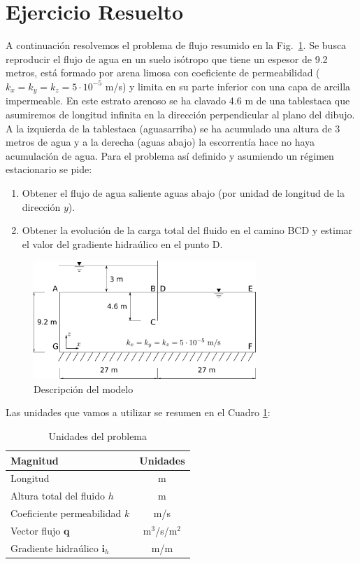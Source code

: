\section{Ejercicio Resuelto}

A continuación resolvemos el problema de flujo resumido en la
Fig.~\ref{enu01}.  Se busca reproducir el flujo de agua en un suelo
isótropo que tiene un espesor de 9.2 metros, está formado por arena
limosa con coeficiente de permeabilidad ($k_x=k_y=k_z=5\cdot10^{-5}$
m/s) y limita en su parte inferior con una capa de arcilla
impermeable.  En este estrato arenoso se ha clavado 4.6 m de una
tablestaca que asumiremos de longitud infinita en la dirección
perpendicular al plano del dibujo. A la izquierda de la tablestaca
(aguasarriba) se ha acumulado una altura de 3 metros de agua y a la
derecha (aguas abajo) la escorrentía hace no haya acumulación de
agua. Para el problema así definido y asumiendo un régimen
estacionario se pide:
\begin{enumerate}
\item Obtener el flujo de agua saliente aguas abajo (por unidad de
  longitud de la dirección $y$).
\item Obtener la evolución de la carga total del fluido en el camino
  BCD y estimar el valor del gradiente hidraúlico en el punto D.
\end{enumerate}

\begin{figure}[!h]
  \begin{center}
    \includegraphics[width=0.75\textwidth]{./body/images/enu01}
  \end{center}
  \caption{Descripción del modelo}
  \label{enu01}
\end{figure}

Las unidades que vamos a utilizar se resumen en el Cuadro \ref{tab:201}:
\begin{table}[!h]
  \centering
  \begin{tabular}{lc}
\hline
Magnitud&Unidades\\
\hline
  Longitud & m\\
  Altura total del fluido $h$ & m \\
  Coeficiente permeabilidad $k$ & m/s\\
  Vector flujo $\mathbf{q}$ & m$^3$/s/m$^2$ \\
  Gradiente hidraúlico $\mathbf{i}_h$ & m/m \\
\hline
  \end{tabular}
  \caption{Unidades del problema}
  \label{tab:201}
\end{table}

